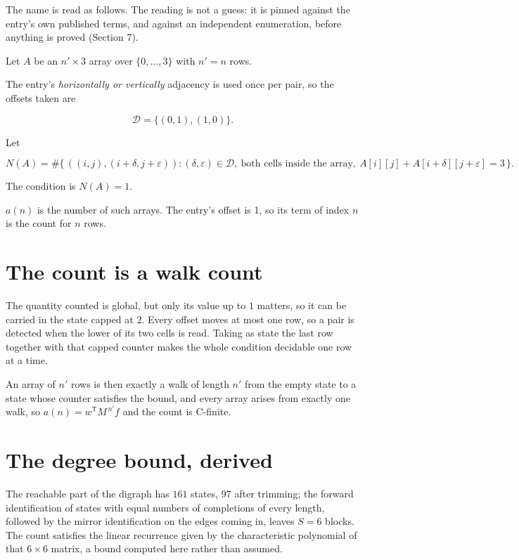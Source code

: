 \documentclass[11pt]{article}
\theoremstyle{definition}
\begin{document}
The name is read as follows. The reading is not a guess: it is pinned against the entry's own published terms, and against an independent enumeration, before anything is proved (Section 7).

Let $A$ be an $n' \times 3$ array over $\{0,\dots,3\}$ with $n' = n$ rows.

The entry's {\itshape horizontally or vertically} adjacency is used once per pair, so the offsets taken are

\[\mathcal{D} = \{(0,1), (1,0)\}.\]

Let

\[N(A) = \#\bigl\{\,((i,j),(i{+}\delta,j{+}\varepsilon)) : (\delta,\varepsilon) \in \mathcal{D},\ \text{both cells inside the array},\ A[i][j] + A[i{+}\delta][j{+}\varepsilon] = 3\,\bigr\}.\]

The condition is $N(A) = 1$.

$a(n)$ is the number of such arrays. The entry's offset is 1, so its term of index $n$ is the count for $n$ rows.

\section{The count is a walk count}

The quantity counted is global, but only its value up to $1$ matters, so it can be carried in the state capped at $2$. Every offset moves at most one row, so a pair is detected when the lower of its two cells is read. Taking as state the last row together with that capped counter makes the whole condition decidable one row at a time.

An array of $n'$ rows is then exactly a walk of length $n'$ from the empty state to a state whose counter satisfies the bound, and every array arises from exactly one walk, so $a(n) = w^{\mathsf T}M^{\,n'}f$ and the count is C-finite.

\section{The degree bound, derived}

The reachable part of the digraph has $161$ states, $97$ after trimming; the forward identification of states with equal numbers of completions of every length, followed by the mirror identification on the edges coming in, leaves $S = 6$ blocks. The count satisfies the linear recurrence given by the characteristic polynomial of that $6\times6$ matrix, a bound computed here rather than assumed.
\end{document}
